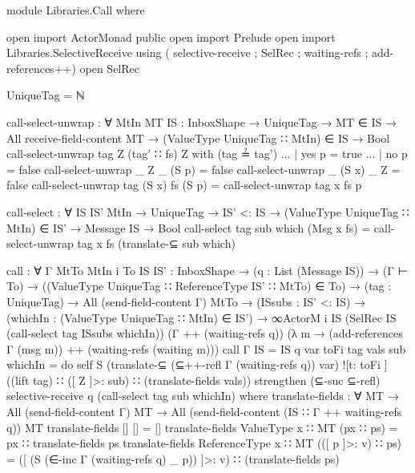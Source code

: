 \begin{code}
module Libraries.Call where

open import ActorMonad public
open import Prelude
open import Libraries.SelectiveReceive using (
            selective-receive ; SelRec ; waiting-refs
            ; add-references++)
open SelRec

UniqueTag = ℕ

call-select-unwrap : ∀ {MtIn MT} {IS : InboxShape} →
                     UniqueTag →
                     MT ∈ IS →
                     All receive-field-content MT →
                     (ValueType UniqueTag ∷ MtIn) ∈ IS →
                     Bool
call-select-unwrap tag Z (tag' ∷ fs) Z with (tag ≟ tag')
... | yes p = true
... | no p = false
call-select-unwrap _ Z _ (S p) = false
call-select-unwrap _ (S x) _ Z = false
call-select-unwrap tag (S x) fs (S p) = call-select-unwrap tag x fs p

call-select : ∀ {IS IS' MtIn} →
              UniqueTag →
              IS' <: IS →
              (ValueType UniqueTag ∷ MtIn) ∈ IS' →
              Message IS →
              Bool
call-select tag sub which (Msg x fs) =
  call-select-unwrap tag x fs (translate-⊆  sub which)

call : ∀ {Γ MtTo MtIn i} {To IS IS' : InboxShape} →
       (q : List (Message IS)) →
       (Γ ⊢ To) →
       ((ValueType UniqueTag ∷ ReferenceType IS' ∷ MtTo) ∈ To) →
       (tag : UniqueTag) →
       All (send-field-content Γ) MtTo →
       (ISsubs : IS' <: IS) →
       (whichIn : (ValueType UniqueTag ∷ MtIn) ∈ IS') →
       ∞ActorM i IS
         (SelRec IS (call-select tag ISsubs whichIn))
         (Γ ++ (waiting-refs q))
         (λ m → (add-references Γ (msg m)) ++ (waiting-refs (waiting m)))
call {Γ} {IS = IS} q var toFi tag vals sub whichIn = do
     self
     S (translate-⊆ (⊆++-refl Γ (waiting-refs q)) var)
       ![t: toFi ]
       ((lift tag) ∷ ([ Z ]>: sub) ∷ (translate-fields vals))
     strengthen (⊆-suc ⊆-refl)
     selective-receive q (call-select tag sub whichIn)
  where
    translate-fields : ∀ {MT} → All (send-field-content  Γ) MT →
                         All (send-field-content (IS ∷ Γ ++ waiting-refs q)) MT
    translate-fields {[]} [] = []
    translate-fields {ValueType x ∷ MT} (px ∷ ps) =
      px ∷ translate-fields ps
    translate-fields {ReferenceType x ∷ MT} (([ p ]>: v) ∷ ps) =
      ([ (S (∈-inc Γ (waiting-refs q) _ p)) ]>: v) ∷ (translate-fields ps)
\end{code}
